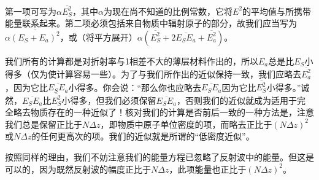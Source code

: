 第一项可写为$\alpha\overline{E_S^2}$，其中$\alpha$为现在尚不知道的比例常数，它将$E^2$的平均值与所携带能量联系起来。第二项必须包括来自物质中辐射原子的部分，故我们应当写为$\alpha\overline{(E_S+E_a)^2}$，或（将平方展开）$\alpha(\overline{E_S^2} + 2\overline{E_SE_a} + \overline{E_a^2})$。

我们所有的计算都是对折射率与1相差不大的薄层材料作出的，所以$E_a$总是比$E_S$小得多（仅为使计算容易一些）。为了与我们所作出的近似保持一致，我们应略去$\overline{E_a^2}$，因为它比$\overline{E_SE_a}$小得多。你会说：“那么你也应略去$\overline{E_SE_a}$因为它比$\overline{E_S^2}$小得多。”诚然，$\overline{E_SE_a}$比$\overline{E_S^2}$小得多，但我们必须保留$\overline{E_SE_a}$，否则我们的近似就成为适用于完全略去物质存在的一种近似了！核对我们的计算是否前后一致的一种方法是，注意我们总是保留正比于$N\Delta z$，即物质中原子单位密度的项，而略去正比于$(N\Delta z)^2$或$N\Delta z$的任何更高次的项。我们的近似就是所谓的“低密度近似”。

按照同样的理由，我们不妨注意我们的能量方程已忽略了反射波中的能量。但这是可以的，因为既然反射波的幅度正比于$N\Delta z$，此项能量也正比于$(N\Delta z)^2$。

